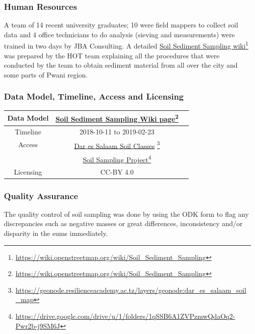 \documentclass[a4paper,12pt,twoside]{article}
\begin{document}
\subsubsection{Human Resources}
A team of 14 recent university graduates; 10 were field mappers to collect soil data and 4 office technicians to do analysis (sieving and measurements) were trained in two days by JBA Consulting. A detailed \href{https://wiki.openstreetmap.org/wiki/Soil_Sediment_Sampling}{Soil Sediment Sampling wiki}\footnote{\url{https://wiki.openstreetmap.org/wiki/Soil_Sediment_Sampling}} was prepared by the HOT team explaining all the procedures that were conducted by the team to obtain sediment material from all over the city and some parts of Pwani region.

\subsubsection{Data Model, Timeline, Access and Licensing}
\begin{center}
  \begin{tabular}{|c|c|c|}  
 \hline
    Data Model    &   \href{https://wiki.openstreetmap.org/wiki/Soil_Sediment_Sampling}{Soil Sediment Sampling Wiki page}\footnote{\url{https://wiki.openstreetmap.org/wiki/Soil_Sediment_Sampling}} \\
 \hline
   Timeline  &   2018-10-11 to 2019-02-23 \\
 \hline  
 Access  & 
    \href{https://geonode.resilienceacademy.ac.tz/layers/geonode:dar_es_salaam_soil_map}{Dar es Salaam Soil Classes} \footnote{\url{https://geonode.resilienceacademy.ac.tz/layers/geonode:dar_es_salaam_soil_map}}\\
{} & \href{https://drive.google.com/drive/u/1/folders/1qSSB6A1ZVPzmwQdaOq2-Pwr2b-j9SM6J}{Soil Sampling Project}\footnote{\url{https://drive.google.com/drive/u/1/folders/1qSSB6A1ZVPzmwQdaOq2-Pwr2b-j9SM6J}}\\ \hline
Licensing &  CC-BY 4.0 \\
 \hline
  
\end{tabular}
\end{center}

\subsubsection{Quality Assurance}
The quality control of soil sampling was done by  using the ODK form to flag any discrepancies such as negative masses or great differences, inconsistency and/or disparity in the sums immediately.
\end{document}
